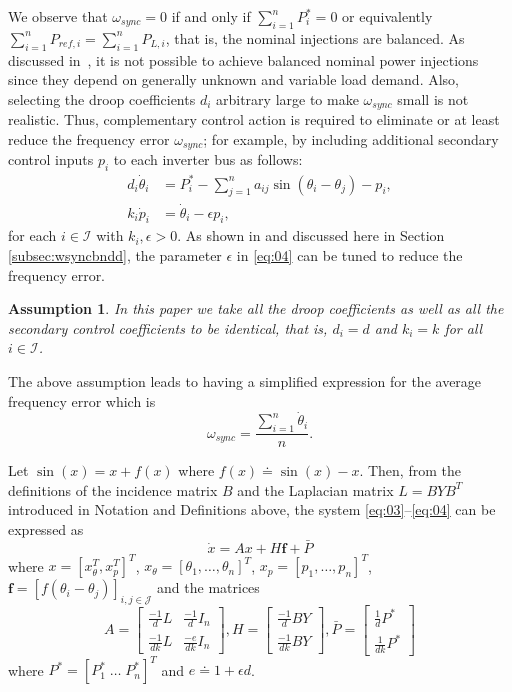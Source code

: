 \documentclass[letter, 10pt, conference]{ieeeconf}
\newtheorem{assu}[theorem]{Assumption}
\newcommand{\I}{\mathcal{I}}
\newcommand{\J}{\mathcal{J}}
\newcommand{\1}{\mathbf{1}}
\newcommand{\0}{\mathbf{0}}
\begin{document}
{We observe that $\omega_{sync}=0$ if and only if $\sum_{i=1}^n P_i^*=0$
or equivalently $\sum_{i=1}^n P_{ref,i} = \sum_{i=1}^n P_{L,i}$,
that is, the nominal injections are balanced. 
As discussed in~\cite{FD-JWSP-FB:14a}, it is not possible to achieve 
balanced nominal power injections since they depend on generally unknown and
variable load demand. Also, selecting the droop coefficients $d_i$
arbitrary large to make $\omega_{sync}$ small is not realistic.
Thus, complementary control action is required to eliminate  or 
at least reduce the frequency error $\omega_{sync}$; for example, 
by including additional secondary control inputs $p_i$ to each inverter
bus as follows:
\begin{align}
	\label{eq:03}
	d_i \dot{\theta}_i &= P_i^*-\sum_{j=1}^{n} a_{ij}\sin(\theta_i-\theta_j)-p_i,
	\\
	\label{eq:04}
	k_i \dot{p}_i &= \dot{\theta}_i - \epsilon p_i,
\end{align}
for each $i \in \I$ with $k_i,\epsilon>0$.
As shown in \cite{AiG13} and  discussed here in Section 
\ref{subsec:wsyncbndd}, the parameter $\epsilon$ in \eqref{eq:04}
can be tuned to reduce the frequency error. 

\begin{assu}
  In this paper we take all the droop coefficients as well as all the secondary
  control coefficients to be identical, that is, $d_i=d$ and $k_i=k$ for all 
  $i\in\I$.
\end{assu}
The above assumption leads to having a simplified expression for the
average frequency error which is
\begin{equation}
	\label{eq:wsync}
	\omega_{sync} =\frac{\sum_{i=1}^n \dot{\theta}_i}{n}.
\end{equation}

Let $\sin(x)=x+f(x)$ where $f(x) \doteq \sin(x)-x$.
Then, from the definitions of the incidence matrix $B$
and the Laplacian matrix $L=BYB^T$ introduced in Notation and Definitions above, the
system \eqref{eq:03}--\eqref{eq:04} can be expressed as
\begin{equation}
	\label{eq:06}
        \dot{x}=Ax+H \mathbf{f}+\bar{P}
\end{equation}
where $x=[x_\theta^T, x_p^T]^T$, $x_\theta=[\theta_1,\dots,\theta_n]^T$, 
$x_p=[p_1,\dots,p_n]^T$, $\mathbf{f}=[f(\theta_i-\theta_j)]_{i,j\in\J}$ and the 
matrices
\begin{equation}
	\label{eq:07}
	A=\begin{bmatrix}
		\frac{-1}{d}  L  & \frac{-1}{d}  I_n \\[2mm]
		\frac{-1}{dk} L  & \frac{-e}{dk} I_n
	\end{bmatrix},
	H=\begin{bmatrix} 
		\frac{-1}{d} B Y  \\[2mm] \frac{-1}{dk} B Y
	  \end{bmatrix},
	\bar{P}=\begin{bmatrix} 
		\frac{1}{d} P^* \\[2mm] \frac{1}{dk} P^*
	\end{bmatrix}
\end{equation}
where $P^*=[P_1^*\; \dots \; P_n^*]^T$ and $e \doteq 1+\epsilon d$.

}
\end{document}
